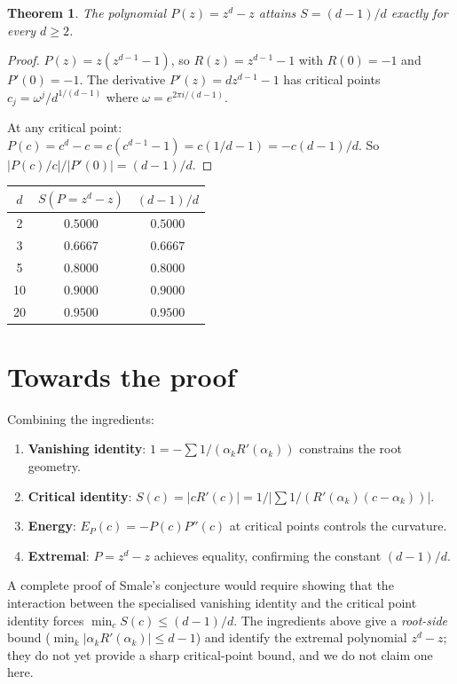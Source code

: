 \documentclass[11pt,a4paper]{article}
\newtheorem{theorem}{Theorem}[section]
\begin{document}
\begin{theorem}
The polynomial $P(z) = z^d - z$ attains $S = (d - 1)/d$ exactly for every $d \ge 2$.
\end{theorem}

\begin{proof}
$P(z) = z(z^{d-1} - 1)$, so $R(z) = z^{d-1} - 1$ with $R(0) = -1$ and $P'(0) = -1$. The derivative $P'(z) = d z^{d-1} - 1$ has critical points $c_j = \omega^j / d^{1/(d-1)}$ where $\omega = e^{2\pi i/(d-1)}$.

At any critical point: $P(c) = c^d - c = c(c^{d-1} - 1) = c(1/d - 1) = -c(d-1)/d$. So $|P(c)/c|/|P'(0)| = (d-1)/d$. \qedhere
\end{proof}

\begin{center}
\begin{tabular}{ccc}
\toprule
$d$ & $S(P = z^d - z)$ & $(d - 1)/d$ \\
\midrule
2  & $0.5000$ & $0.5000$ \\
3  & $0.6667$ & $0.6667$ \\
5  & $0.8000$ & $0.8000$ \\
10 & $0.9000$ & $0.9000$ \\
20 & $0.9500$ & $0.9500$ \\
\bottomrule
\end{tabular}
\end{center}

\section{Towards the proof}

Combining the ingredients:
\begin{enumerate}
\item \textbf{Vanishing identity}: $1 = -\sum 1/(\alpha_k R'(\alpha_k))$ constrains the root geometry.
\item \textbf{Critical identity}: $S(c) = |c R'(c)| = 1/|\sum 1/(R'(\alpha_k)(c - \alpha_k))|$.
\item \textbf{Energy}: $E_P(c) = -P(c) P''(c)$ at critical points controls the curvature.
\item \textbf{Extremal}: $P = z^d - z$ achieves equality, confirming the constant $(d - 1)/d$.
\end{enumerate}

A complete proof of Smale's conjecture would require showing that the interaction between the specialised vanishing identity and the critical point identity forces $\min_c S(c) \le (d - 1)/d$. The ingredients above give a \emph{root-side} bound ($\min_k |\alpha_k R'(\alpha_k)| \le d - 1$) and identify the extremal polynomial $z^d - z$; they do not yet provide a sharp critical-point bound, and we do not claim one here.
\end{document}
